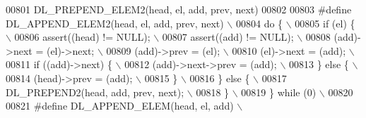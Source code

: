 \begin{DoxyCode}
00801 \textcolor{preprocessor}{    DL\_PREPEND\_ELEM2(head, el, add, prev, next)}
00802 
00803 \textcolor{preprocessor}{#define DL\_APPEND\_ELEM2(head, el, add, prev, next)                                             \(\backslash\)}
00804 \textcolor{preprocessor}{do \{                                                                                           \(\backslash\)}
00805 \textcolor{preprocessor}{ if (el) \{                                                                                     \(\backslash\)}
00806 \textcolor{preprocessor}{  assert((head) != NULL);                                                                      \(\backslash\)}
00807 \textcolor{preprocessor}{  assert((add) != NULL);                                                                       \(\backslash\)}
00808 \textcolor{preprocessor}{  (add)->next = (el)->next;                                                                    \(\backslash\)}
00809 \textcolor{preprocessor}{  (add)->prev = (el);                                                                          \(\backslash\)}
00810 \textcolor{preprocessor}{  (el)->next = (add);                                                                          \(\backslash\)}
00811 \textcolor{preprocessor}{  if ((add)->next) \{                                                                           \(\backslash\)}
00812 \textcolor{preprocessor}{   (add)->next->prev = (add);                                                                  \(\backslash\)}
00813 \textcolor{preprocessor}{  \} else \{                                                                                     \(\backslash\)}
00814 \textcolor{preprocessor}{   (head)->prev = (add);                                                                       \(\backslash\)}
00815 \textcolor{preprocessor}{  \}                                                                                            \(\backslash\)}
00816 \textcolor{preprocessor}{ \} else \{                                                                                      \(\backslash\)}
00817 \textcolor{preprocessor}{  DL\_PREPEND2(head, add, prev, next);                                                          \(\backslash\)}
00818 \textcolor{preprocessor}{ \}                                                                                             \(\backslash\)}
00819 \textcolor{preprocessor}{\} while (0)                                                                                    \(\backslash\)}
00820 \textcolor{preprocessor}{}
00821 \textcolor{preprocessor}{#define DL\_APPEND\_ELEM(head, el, add)                                                          \(\backslash\)}

\end{DoxyCode}
